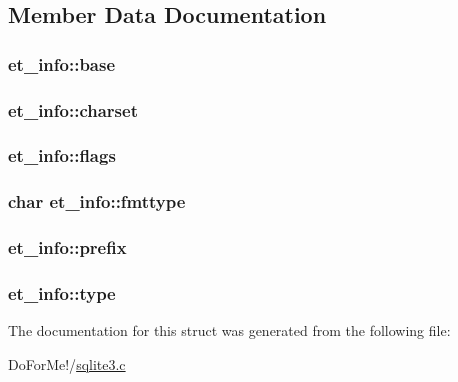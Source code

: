 \subsection{Member Data Documentation}
\hypertarget{structet__info_a20f5a4c11c7aa1d9c777805d11965c66}{
\subsubsection[{base}]{ et\-\_\-info\-::base}}\label{structet__info_a20f5a4c11c7aa1d9c777805d11965c66}
\hypertarget{structet__info_a77131acb7479b0e6aad61af0901e11c2}{
\subsubsection[{charset}]{ et\-\_\-info\-::charset}}\label{structet__info_a77131acb7479b0e6aad61af0901e11c2}
\hypertarget{structet__info_a8f11646aaec803f0870683dc3ba2f756}{
\subsubsection[{flags}]{ et\-\_\-info\-::flags}}\label{structet__info_a8f11646aaec803f0870683dc3ba2f756}
\hypertarget{structet__info_a1740af27f0c9d5840e7dda59a129aa4b}{
\subsubsection[{fmttype}]{\setlength{\rightskip}{0pt plus 5cm}char et\-\_\-info\-::fmttype}}\label{structet__info_a1740af27f0c9d5840e7dda59a129aa4b}
\hypertarget{structet__info_a23cc866bf202c34e49bd49599b051628}{
\subsubsection[{prefix}]{ et\-\_\-info\-::prefix}}\label{structet__info_a23cc866bf202c34e49bd49599b051628}
\hypertarget{structet__info_a148bd1efa49018c9a723701ba5747825}{
\subsubsection[{type}]{ et\-\_\-info\-::type}}\label{structet__info_a148bd1efa49018c9a723701ba5747825}


The documentation for this struct was generated from the following file\-:\begin{DoxyCompactItemize}
\item 
Do\-For\-Me!/\hyperlink{sqlite3_8c}{sqlite3.\-c}\end{DoxyCompactItemize}
